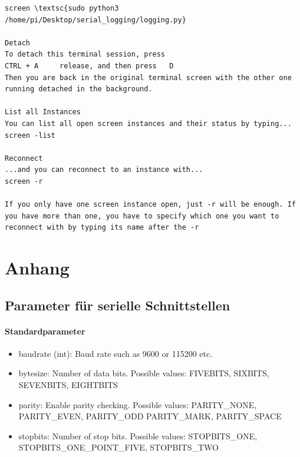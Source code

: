 \documentclass{article}
\begin{document}
\begin{lstlisting}
screen \textsc{sudo python3 /home/pi/Desktop/serial_logging/logging.py}

Detach
To detach this terminal session, press
CTRL + A     release, and then press   D
Then you are back in the original terminal screen with the other one running detached in the background.

List all Instances
You can list all open screen instances and their status by typing...
screen -list

Reconnect
...and you can reconnect to an instance with...
screen -r

If you only have one screen instance open, just -r will be enough. If you have more than one, you have to specify which one you want to reconnect with by typing its name after the -r
\end{lstlisting}




\section{Anhang}
\subsection{Parameter für serielle Schnittstellen} \label{parameters}

\paragraph{Standardparameter} 
\begin{itemize}
    \item baudrate (int): Baud rate such as 9600 or 115200 etc.
    \item bytesize: Number of data bits. Possible values: FIVEBITS, SIXBITS, SEVENBITS, EIGHTBITS
    \item parity: Enable parity checking. Possible values: PARITY\_NONE, PARITY\_EVEN, PARITY\_ODD PARITY\_MARK, PARITY\_SPACE
    \item stopbits: Number of stop bits. Possible values: STOPBITS\_ONE, STOPBITS\_ONE\_POINT\_FIVE, STOPBITS\_TWO
\end{itemize}
\end{document}
